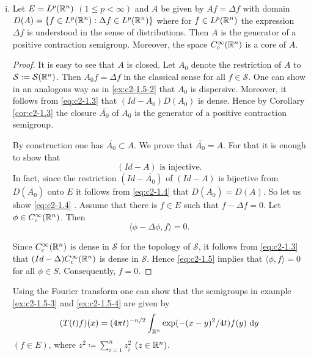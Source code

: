 \begin{examples}
\begin{enumerate}[(i)]
\item \label{ex:c2-1.5-4} 
Let $E = L^{p}(\mathbb{R}^{n})$ $(1 \leq p < \infty)$ and $A$ be given by $Af = \Delta f$ with domain $D(A) = \{f \in L^{p}(\mathbb{R}^{n}) : \Delta f \in L^{p}(\mathbb{R}^{n})\}$ where for $f \in L^{p}(\mathbb{R}^{n})$ the expression $\Delta f$ is understood in the sense of distributions. Then $A$ is the generator of a positive contraction semigroup. Moreover, the space $C_{c}^{\infty}(\mathbb{R}^{n})$ is a core of $A$.

\begin{proof}
It is easy to see that $A$ is closed. 
Let $A_{0}$ denote the restriction of $A$ to $\mathcal{S} := \mathcal{S}(\mathbb{R}^{n})$. 
Then $A_{0}f = \Delta f$ in the classical sense for all $f \in \mathcal{S}$.
One can show in an analogous way as in \ref{ex:c2-1.5-2}   that $A_{0}$ is dispersive. 
Moreover, it follows from \eqref{eq:c2-1.3} that $(Id - A_{0})D(A_{0})$ is dense. 
Hence by Corollary \ref{cor:c2-1.3}   the closure $\overline{A_{0}}$ of $A_{0}$ is the generator of a positive contraction semigroup.

By construction one has $\overline{A_{0}} \subset A$. 
We prove that $\overline{A_{0}} = A$. 
For that it is enough to show that
\begin{equation}\label{eq:c2-1.4}
(Id - A) \text{ is injective.}
\end{equation}
In fact, since the restriction $(Id - \overline{A_{0}})$ of $(Id - A)$ is bijective from $D(\overline{A_{0}})$ onto $E$ it follows from  \eqref{eq:c2-1.4}  that $D(\overline{A_{0}}) = D(A)$. 
So let us show  \eqref{eq:c2-1.4}  . 
Assume that there is $f \in E$ such that $f - \Delta f = 0$.
Let $\phi \in C_{c}^{\infty}(\mathbb{R}^{n})$. 
Then
\begin{equation} \label{eq:c2-1.5}
\langle \phi - \Delta\phi,f \rangle = 0.
\end{equation}

Since $C_{c}^{\infty}(\mathbb{R}^{n})$ is dense in $\mathcal{S}$ for the topology of $\mathcal{S}$, it follows from  \eqref{eq:c2-1.3}    that $(Id - \Delta)C_{c}^{\infty}(\mathbb{R}^{n})$ is dense in $\mathcal{S}$. Hence  \eqref{eq:c2-1.5}   implies
that $\langle \phi, f \rangle = 0$ for all $\phi \in S$. 
Consequently, $f = 0$.
\end{proof}

\begin{remark*}\label{rem:c2-1.3}
Using the Fourier transform one can show that the semigroups in example \ref{ex:c2-1.5-3}   and \ref{ex:c2-1.5-4}   are given by
\begin{equation}\label{eq:c2-1.6}
(T(t)f)(x) = (4\pi t)^{-n/2} \int_{\mathbb{R}^n} \exp(-(x-y)^{2}/4t) f(y) \, \mathop{}\!\mathrm{d}{y}
\end{equation}
$(f \in E)$, where $z^{2} \coloneqq \sum_{i=1}^n z_{i}^{2}$ $(z \in \mathbb{R}^n)$.
\end{remark*}


\end{enumerate}
\end{examples}
